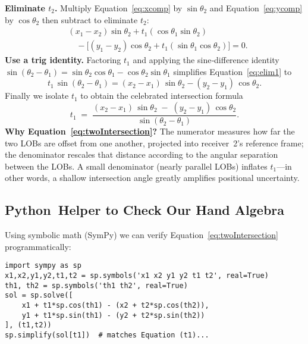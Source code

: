 \documentclass[11pt]{article}
\begin{document}
\textbf{Eliminate $t_2$.}  Multiply Equation~\eqref{eq:xcomp} by $\sin\theta_2$ and Equation~\eqref{eq:ycomp} by $\cos\theta_2$ then subtract to eliminate $t_2$:
\begin{align}
  &(x_1-x_2)\sin\theta_2 + t_1(\cos\theta_1\sin\theta_2) \\
  &\quad-\bigl[(y_1-y_2)\cos\theta_2 + t_1(\sin\theta_1\cos\theta_2)\bigr] = 0.\label{eq:elim1}
\end{align}
\textbf{Use a trig identity.}  Factoring $t_1$ and applying the sine‑difference identity $\sin(\theta_2-\theta_1)=\sin\theta_2\cos\theta_1-\cos\theta_2\sin\theta_1$ simplifies Equation~\eqref{eq:elim1} to
\begin{equation}
  t_1\,\sin(\theta_2-\theta_1) = (x_2 - x_1)\,\sin\theta_2 - (y_2 - y_1)\,\cos\theta_2.
\end{equation}
Finally we isolate $t_1$ to obtain the celebrated intersection formula
\begin{equation}
  t_1\;=\;\frac{(x_2 - x_1)\,\sin\theta_2\;-\; (y_2 - y_1)\,\cos\theta_2}{\sin(\theta_2 - \theta_1)}.
  \label{eq:twoIntersection}
\end{equation}
\noindent\textbf{Why Equation~\eqref{eq:twoIntersection}?}  The numerator measures how far the two LOBs are offset from one another, projected into receiver~2’s reference frame; the denominator rescales that distance according to the angular separation between the LOBs.  A small denominator (nearly parallel LOBs) inflates $t_1$—in other words, a shallow intersection angle greatly amplifies positional uncertainty.

\subsection{Python Helper to Check Our Hand Algebra}
Using symbolic math (\textsf{SymPy}) we can verify Equation~\eqref{eq:twoIntersection} programmatically:
\begin{verbatim}
import sympy as sp
x1,x2,y1,y2,t1,t2 = sp.symbols('x1 x2 y1 y2 t1 t2', real=True)
th1, th2 = sp.symbols('th1 th2', real=True)
sol = sp.solve([
    x1 + t1*sp.cos(th1) - (x2 + t2*sp.cos(th2)),
    y1 + t1*sp.sin(th1) - (y2 + t2*sp.sin(th2))
], (t1,t2))
sp.simplify(sol[t1])  # matches Equation (t1)...
\end{verbatim}

\end{document}
